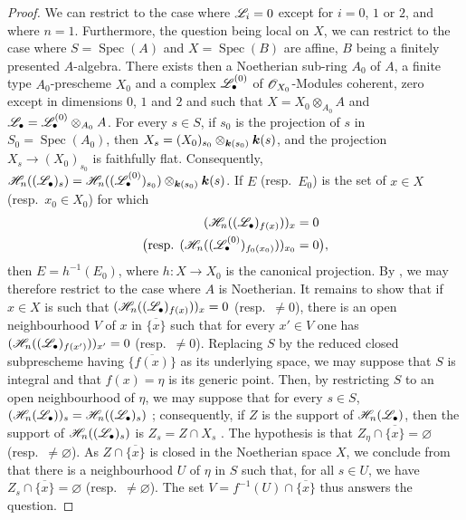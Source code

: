 \begin{proof}
\label{IV.9.9.6-proof}
We can restrict to the case where $\mathscr{L}_i=0$ except for $i=0$, $1$ or $2$, and where $n=1$.
Furthermore, the question being local on $X$, we can restrict to the case where $S=\operatorname{Spec}(A)$ and $X=\operatorname{Spec}(B)$ are affine, $B$ being a finitely presented $A$-algebra.
There exists then a Noetherian sub-ring $A_0$ of $A$, a finite type $A_0$-prescheme $X_0$ and a complex $\mathscr{L}_\bullet^{(0)}$ of $\mathscr{O}_{X_0}$-Modules coherent, zero except in dimensions $0$, $1$ and $2$ and such that $X=X_0\otimes_{A_0}A$ and $\mathscr{L}_\bullet=\mathscr{L}_\bullet^{(0)}\otimes_{A_0}A$.
For every $s\in S$, if $s_0$ is the projection of $s$ in $S_0=\operatorname{Spec}(A_0)$, then $X_s=(X_0)_{s_0}\otimes_{\boldsymbol{k}(s_0)}\boldsymbol{k}(s)$,
and the projection $X_s\to(X_0)_{s_0}$ is faithfully flat.
Consequently, $\mathscr{H}_n((\mathscr{L}_\bullet)_s)
=\mathscr{H}_n((\mathscr{L}_\bullet^{(0)})_{s_0})\otimes_{\boldsymbol{k}(s_0)}\boldsymbol{k}(s)$.
If $E$ (resp.~$E_0$) is the set of $x\in X$ (resp.~$x_0\in X_0$) for which
\[
  \begin{aligned}
  (\mathscr{H}_n((\mathscr{L}_\bullet)_{f(x)}))_x&=0\\
  \bigl(\text{resp. }(\mathscr{H}_n((\mathscr{L}_\bullet^{(0)})_{f_0(x_0)}))_{x_0}&=0\bigr),
  \end{aligned}
\]
then $E=h^{-1}(E_0)$, where $h:X\to X_0$ is the canonical projection.
By , we may therefore restrict to the case where $A$ is Noetherian.
It remains to show  that if $x\in X$ is such that $(\mathscr{H}_n((\mathscr{L}_\bullet)_{f(x)}))_x=0$ (resp.~$\neq 0$), there is an open neighbourhood $V$ of $x$ in $\overline{\{x\}}$ such that for every $x'\in V$ one has $(\mathscr{H}_n((\mathscr{L}_\bullet)_{f(x')}))_{x'}=0$ (resp.~$\neq 0$).
Replacing $S$ by the reduced closed subprescheme having $\overline{\{f(x)\}}$ as its underlying space, we may suppose that $S$ is integral and that $f(x)=\eta$ is its generic point.
Then, by restricting $S$ to an open neighbourhood of $\eta$, we may suppose that for every $s\in S$,
$(\mathscr{H}_n(\mathscr{L}_\bullet))_s=\mathscr{H}_n((\mathscr{L}_\bullet)_s)$ ; consequently, if $Z$ is the support of $\mathscr{H}_n(\mathscr{L}_\bullet)$, then the support of $\mathscr{H}_n((\mathscr{L}_\bullet)_s)$ is $Z_s=Z\cap X_s$ .
The hypothesis is that $Z_\eta\cap\overline{\{x\}}=\varnothing$ (resp.~$\neq\varnothing$).
As $Z\cap\overline{\{x\}}$ is closed in the Noetherian space $X$, we conclude from  that there is a neighbourhood $U$ of $\eta$ in $S$ such that, for all $s\in U$, we have $Z_s\cap\overline{\{x\}}=\varnothing$ (resp.~$\neq\varnothing$).
The set $V=f^{-1}(U)\cap\overline{\{x\}}$ thus answers the question.
\end{proof}
